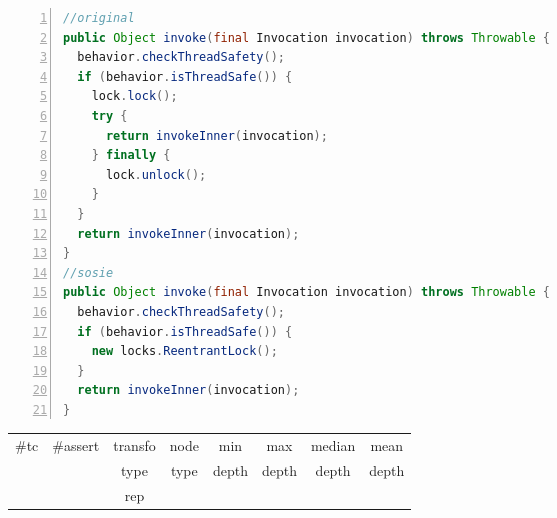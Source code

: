 \begin{minipage}{\columnwidth}
\begin{lstlisting}[caption={Two variants of \texttt{invoke} in EasyMock},language=java,numbers=left]
//original
public Object invoke(final Invocation invocation) throws Throwable {
  behavior.checkThreadSafety();
  if (behavior.isThreadSafe()) {
    lock.lock();
    try {
      return invokeInner(invocation);
    } finally {
      lock.unlock();
    }
  }
  return invokeInner(invocation);
}
//sosie
public Object invoke(final Invocation invocation) throws Throwable {
  behavior.checkThreadSafety();
  if (behavior.isThreadSafe()) {
    new locks.ReentrantLock();
  }
  return invokeInner(invocation);
}
\end{lstlisting}
\tabcolsep=0.11cm
\begin{tabular}{>{\small}c>{\small}c>{\small}c>{\small}c>{\small}c>{\small}c>{\small}c>{\small}c}
\hline
\rowcolor{lightgray} \#tc & \#assert & transfo & node & min & max & median & mean   \\
\rowcolor{lightgray}  & & type & type & depth  & depth & depth & depth  \\ 
\hline
&  & rep &  &  &  &  & \\
\hline
\end{tabular}
\end{minipage}